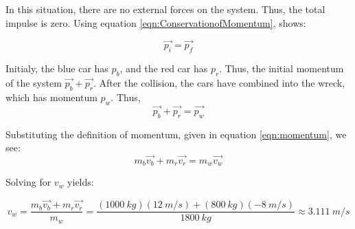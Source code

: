 \begin{mdframed}[backgroundcolor=blue!10!white]
\begin{center}
\begin{tikzpicture}
	\end{tikzpicture}
		\end{center}
	
	In this situation, there are no external forces on the system. Thus, the total impulse is zero.  Using equation \ref{eqn:ConservationofMomentum}, shows:
	
		\begin{equation*}
			\vec{p_i} = \vec{p_f}
		\end{equation*}
	
Initialy, the blue car has $p_b$, and the red car has $p_r$.  Thus, the initial momentum of the system $\vec{p_b} +\vec{p_r}$.  After the collision, the cars have combined into the wreck, which has momentum $p_w$.  Thus,
		\begin{equation*}
		\vec{p_b} +\vec{p_r}  = \vec{p_w}
	\end{equation*}
	
Substituting the definition of momentum, given in equation \ref{eqn:momentum}, we see:
		\begin{equation*}
	m_b \vec{v_b} + m_r \vec{v_r} = m_w \vec{v_w}
\end{equation*}

Solving for $v_w$ yields:

\begin{equation*}
v_w = \frac{m_b \vec{v_b} + m_r \vec{v_r}}{m_w} = \frac{(\SI{1000}{kg})(\SI{12}{m/s}) + (\SI{800}{kg})(\SI{-8}{m/s})}{\SI{1800}{kg}} \approx \boxed{\SI{3.111}{m/s}} 
\end{equation*}

	
\end{mdframed}
\vspace{0.1in}








